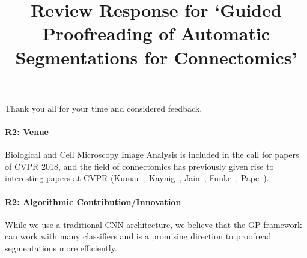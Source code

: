 \documentclass[10pt,twocolumn,letterpaper]{article}
\begin{document}
\title{\vspace{-0.5cm}Review Response for `Guided Proofreading of Automatic Segmentations for Connectomics'}  %

\maketitle
\thispagestyle{empty}

\noindent Thank you all for your time and considered feedback.

\paragraph{R2: Venue} Biological and Cell Microscopy Image Analysis is included in the call for papers of CVPR 2018, and the field of connectomics has previously given rise to interesting papers at CVPR (Kumar~, Kaynig~, Jain~, Funke~, Pape~). %

\paragraph{R2: Algorithmic Contribution/Innovation} While we use a traditional CNN architecture, we believe that the GP framework can work with many classifiers and is a promising direction to proofread segmentations more efficiently. %

\end{document}
